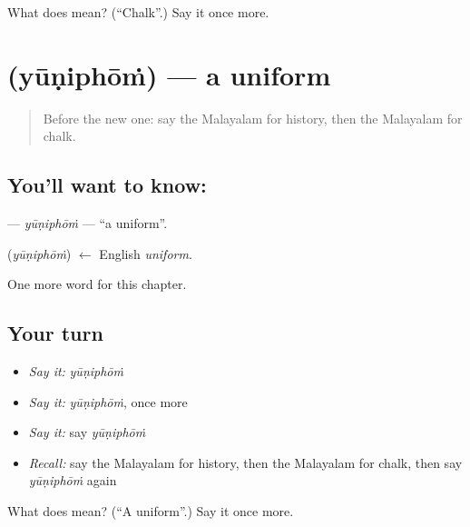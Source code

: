 \begin{tcolorbox}[breakable,colback=teal!4,colframe=teal!35!black,title={Before you move on}]
What does  mean? (\textquotedblleft{}Chalk\textquotedblright{}.) Say it once more.
\end{tcolorbox}
\section[\texorpdfstring{\ml{യൂണിഫോം} (yūṇiphōṁ)}{യൂണിഫോം (yūṇiphōṁ)}]{ (yūṇiphōṁ) — a uniform}

\label{lesson:ML-C337-yuniphom}



\begin{quote}
Before the new one: say the Malayalam for history, then the Malayalam for chalk.
\end{quote}

\subsection*{You'll want to know: }
\textbf{} — \emph{yūṇiphōṁ} — \textquotedblleft{}a uniform\textquotedblright{}.

\begin{cousinweb}
\textbf{} (\emph{yūṇiphōṁ}) $\leftarrow$ English \emph{uniform}.
\end{cousinweb}

\begin{grammarlens}[title={What you've built}]
One more word for this chapter.
\end{grammarlens}

\subsection*{Your turn}
\begin{itemize}
\raggedright
  \item \emph{Say it:} \emph{yūṇiphōṁ}
  \item \emph{Say it:} \emph{yūṇiphōṁ}, once more
  \item \emph{Say it:} say \emph{yūṇiphōṁ}
  \item \emph{Recall:} say the Malayalam for history, then the Malayalam for chalk, then say \emph{yūṇiphōṁ} again
\end{itemize}

\begin{tcolorbox}[breakable,colback=teal!4,colframe=teal!35!black,title={Before you move on}]
What does  mean? (\textquotedblleft{}A uniform\textquotedblright{}.) Say it once more.
\end{tcolorbox}
